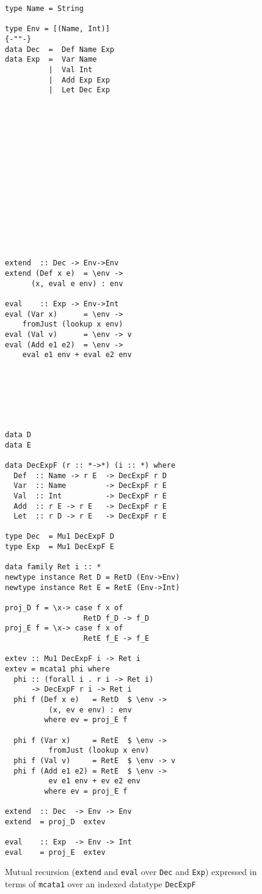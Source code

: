 \documentclass[letterpaper,12pt]{article}
\begin{document}
\begin{figure}
\begin{minipage}{.5\textwidth}
\begin{verbatim}
type Name = String

type Env = [(Name, Int)]
{-""-}
data Dec  =  Def Name Exp
data Exp  =  Var Name
          |  Val Int
          |  Add Exp Exp
          |  Let Dec Exp
















extend  :: Dec -> Env->Env
extend (Def x e)  = \env ->
      (x, eval e env) : env

eval    :: Exp -> Env->Int
eval (Var x)      = \env ->
    fromJust (lookup x env)
eval (Val v)      = \env -> v
eval (Add e1 e2)  = \env ->
    eval e1 env + eval e2 env







\end{verbatim}
\end{minipage}
\begin{minipage}{.5\textwidth}
\begin{verbatim}
data D
data E

data DecExpF (r :: *->*) (i :: *) where
  Def  :: Name -> r E  -> DecExpF r D
  Var  :: Name         -> DecExpF r E
  Val  :: Int          -> DecExpF r E
  Add  :: r E -> r E   -> DecExpF r E
  Let  :: r D -> r E   -> DecExpF r E

type Dec  = Mu1 DecExpF D
type Exp  = Mu1 DecExpF E

data family Ret i :: *
newtype instance Ret D = RetD (Env->Env)
newtype instance Ret E = RetE (Env->Int)

proj_D f = \x-> case f x of 
                  RetD f_D -> f_D
proj_E f = \x-> case f x of
                  RetE f_E -> f_E

extev :: Mu1 DecExpF i -> Ret i
extev = mcata1 phi where
  phi :: (forall i . r i -> Ret i)
      -> DecExpF r i -> Ret i
  phi f (Def x e)   = RetD  $ \env ->
          (x, ev e env) : env
         where ev = proj_E f

  phi f (Var x)     = RetE  $ \env ->
          fromJust (lookup x env)
  phi f (Val v)     = RetE  $ \env -> v
  phi f (Add e1 e2) = RetE  $ \env ->
          ev e1 env + ev e2 env
         where ev = proj_E f

extend  :: Dec  -> Env -> Env
extend  = proj_D  extev

eval    :: Exp  -> Env -> Int
eval    = proj_E  extev
\end{verbatim}
\end{minipage}
\caption{Mutual recursion (\texttt{extend} and \texttt{eval} over \texttt{Dec} and \texttt{Exp})
         expressed in terms of \texttt{mcata1} over an indexed datatype \texttt{DecExpF}}
\label{fig:mutrec}
\end{figure}
\end{document}
